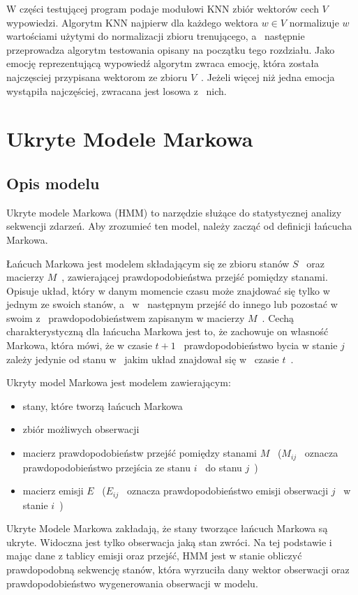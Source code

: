 \documentclass[declaration,shortabstract]{iithesis}
\begin{document}
W części testującej program podaje modułowi KNN zbiór wektorów cech $V$~ wypowiedzi. Algorytm KNN najpierw dla każdego wektora $w \in V$ normalizuje $w$~ wartościami użytymi do normalizacji zbioru trenującego, a~ następnie przeprowadza algorytm testowania opisany na początku tego rozdziału. Jako emocję reprezentującą wypowiedź algorytm zwraca emocję, która została najczęsciej przypisana wektorom ze zbioru $V$~. Jeżeli więcej niż jedna emocja wystąpiła najczęściej, zwracana jest losowa z~ nich.  

\chapter{Ukryte Modele Markowa}
\section{Opis modelu}
Ukryte modele Markowa (HMM) to narzędzie służące do statystycznej analizy sekwencji zdarzeń. Aby zrozumieć ten model, należy zacząć od 
definicji łańcucha Markowa.

Łańcuch Markowa jest modelem składającym się ze zbioru stanów $S$~ oraz macierzy $M$~, zawierającej prawdopodobieństwa przejść pomiędzy stanami. Opisuje układ, który w danym momencie czasu może znajdować się tylko w jednym ze swoich stanów, a~ w~ następnym przejść do innego lub pozostać w~ swoim z~ prawdopodobieństwem zapisanym w macierzy $M$~. Cechą charakterystyczną dla łańcucha Markowa jest to, że zachowuje on własność Markowa, która mówi, że w czasie $t+1$~ prawdopodobieństwo bycia w stanie $j$~ zależy jedynie od stanu w~ jakim układ znajdował się w~ czasie $t$~.

Ukryty model Markowa jest modelem zawierającym:
\begin{itemize}
\item stany, które tworzą łańcuch Markowa
\item zbiór możliwych obserwacji
\item macierz prawdopodobieństw przejść pomiędzy stanami $M$~ ($M_{ij}$~ oznacza prawdopodobieństwo przejścia ze stanu $i$~ do stanu $j$~)
\item macierz emisji $E$~ ($E_{ij}$~ oznacza prawdopodobieństwo emisji obserwacji $j$~ w~ stanie $i$~)
\end{itemize}

Ukryte Modele Markowa zakładają, że stany tworzące łańcuch Markowa są ukryte. Widoczna jest tylko obserwacja jaką stan zwróci. Na tej podstawie i~ mając dane z tablicy emisji oraz przejść, HMM jest w stanie obliczyć prawdopodobną sekwencję stanów, która wyrzuciła dany wektor obserwacji oraz prawdopodobieństwo wygenerowania obserwacji w modelu.
\end{document}
